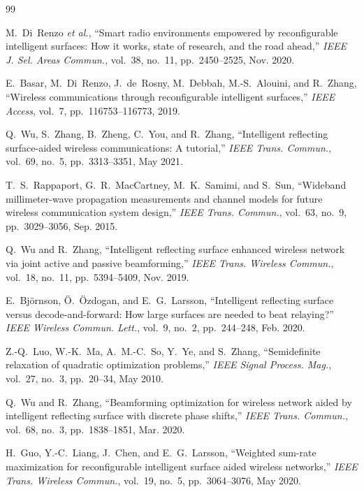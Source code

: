 \documentclass[journal]{IEEEtran}
\begin{document}
\begin{thebibliography}{99}
\footnotesize

M.~Di~Renzo \emph{et al.}, ``Smart radio environments empowered by reconfigurable intelligent surfaces: How it works, state of research, and the road ahead,'' \emph{IEEE J. Sel. Areas Commun.}, vol.~38, no.~11, pp.~2450--2525, Nov. 2020.

E.~Basar, M.~Di~Renzo, J.~de~Rosny, M.~Debbah, M.-S.~Alouini, and R.~Zhang, ``Wireless communications through reconfigurable intelligent surfaces,'' \emph{IEEE Access}, vol.~7, pp.~116753--116773, 2019.

Q.~Wu, S.~Zhang, B.~Zheng, C.~You, and R.~Zhang, ``Intelligent reflecting surface-aided wireless communications: A tutorial,'' \emph{IEEE Trans. Commun.}, vol.~69, no.~5, pp.~3313--3351, May 2021.

T.~S.~Rappaport, G.~R.~MacCartney, M.~K.~Samimi, and S.~Sun, ``Wideband millimeter-wave propagation measurements and channel models for future wireless communication system design,'' \emph{IEEE Trans. Commun.}, vol.~63, no.~9, pp.~3029--3056, Sep. 2015.

Q.~Wu and R.~Zhang, ``Intelligent reflecting surface enhanced wireless network via joint active and passive beamforming,'' \emph{IEEE Trans. Wireless Commun.}, vol.~18, no.~11, pp.~5394--5409, Nov. 2019.

E.~Bj\"{o}rnson, \"{O}.~\"{O}zdogan, and E.~G.~Larsson, ``Intelligent reflecting surface versus decode-and-forward: How large surfaces are needed to beat relaying?'' \emph{IEEE Wireless Commun. Lett.}, vol.~9, no.~2, pp.~244--248, Feb. 2020.

Z.-Q.~Luo, W.-K.~Ma, A.~M.-C.~So, Y.~Ye, and S.~Zhang, ``Semidefinite relaxation of quadratic optimization problems,'' \emph{IEEE Signal Process. Mag.}, vol.~27, no.~3, pp.~20--34, May 2010.

Q.~Wu and R.~Zhang, ``Beamforming optimization for wireless network aided by intelligent reflecting surface with discrete phase shifts,'' \emph{IEEE Trans. Commun.}, vol.~68, no.~3, pp.~1838--1851, Mar. 2020.

H.~Guo, Y.-C.~Liang, J.~Chen, and E.~G.~Larsson, ``Weighted sum-rate maximization for reconfigurable intelligent surface aided wireless networks,'' \emph{IEEE Trans. Wireless Commun.}, vol.~19, no.~5, pp.~3064--3076, May 2020.


\end{thebibliography}
\end{document}
